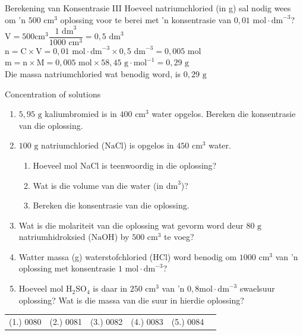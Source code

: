       \begin{wex}{Berekening van Konsentrasie III }
{
\label{m38712*id283476}Hoeveel natriumchloried (in g) sal nodig wees om  'n $500 {\text{ cm}}^{3}$ oplossing voor te berei met 'n konsentrasie van $0,01 \text{ mol} \cdot \text{dm}^{-3}$?
   }
{
$\text{V}= 500 \text{cm}^{3} \dfrac{1 \text{ dm}^{3}}{1 000 \text{ cm}^{3}}=0,5 {\text{ dm}}^{3}$
$\text{n}=\text{C} \times \text{V}= 0,01 \text{ mol} \cdot \text{dm}^{-3} \times 0,5 \text{ dm}^{-3} = 0,005 \text{ mol}$
$\text{m}=\text{n} \times \text{M}= 0,005 \text{ mol} \times 58,45 \text{ g} \cdot \text{mol}^{-1} = 0,29 \text{ g}$\\
Die massa natriumchloried wat benodig word, is $0,29 \text{ g}$ 
}
    \end{wex}
    \noindent
\label{m38712*secfhsst!!!underscore!!!id1879}
            \begin{exercises}{ Concentration of solutions
      }
            \nopagebreak \noindent
      \label{m38712*id283713}\begin{enumerate}[noitemsep, label=\textbf{\arabic*}. ] 
\item $5,95 \text{ g}$ kaliumbromied is in $400 {\text{ cm}}^{3}$ water opgelos. Bereken die konsentrasie van die oplossing.
\item $100 \text{ g}$ natriumchloried ($\text{NaCl}$) is opgelos in $450 {\text{ cm}}^{3}$ water.
  \begin{enumerate}[noitemsep, label=\textbf{\alph*}. ] 
    \item Hoeveel mol NaCl is teenwoordig in die oplossing?
    \item Wat is die volume van die water (in ${\text{dm}}^{3}$)?
    \item Bereken die konsentrasie van die oplossing.
\end{enumerate}
\item Wat is die molariteit van die oplossing wat gevorm word deur $80 \text{ g}$ natriumhidroksied ($\text{NaOH}$) by $500 {\text{ cm}}^{3}$ te voeg? 
\item Watter massa (g) waterstofchloried ($\text{HCl}$) word benodig om $1000 {\text{ cm}}^{3}$ van  'n oplossing met konsentrasie $1 \text{ mol} \cdot {\text{dm}}^{-3}$?
\item Hoeveel mol $\text{H}{}_{2}\text{SO}{}_{4}$ is daar in $250 {\text{ cm}}^{3}$ van  'n $0,8 \text{mol} \cdot \text{dm}^{-3}$ swaelsuur oplossing? Wat is die massa van die suur in hierdie oplossing?
\end{enumerate}
\practiceinfo
\par 
 \par \begin{tabular}[h]{cccccc}
 (1.) 0080  &  (2.) 0081  &  (3.) 0082  &  (4.) 0083  &  (5.) 0084  & \end{tabular}
\end{exercises}
